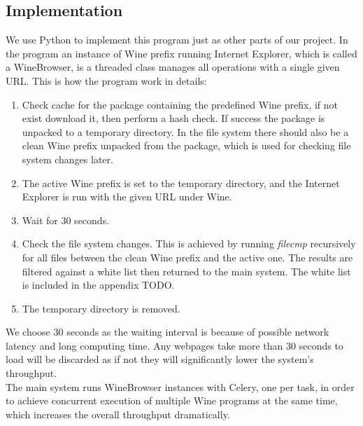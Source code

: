 \subsection{Implementation}
We use Python to implement this program just as other parts of our project. 
In the program an instance of Wine prefix running Internet Explorer, which is called 
a WineBrowser, is a threaded class manages all operations with a single 
given URL. This is how the program work in details:
\begin{enumerate}
\item
Check cache for the package containing the predefined Wine prefix, if not 
exist download it, then perform a hash check.
If success the package is unpacked to a temporary directory. 
In the file system there should also be a clean Wine prefix unpacked from the 
package, which is used for checking file system changes later. 
\item
The active Wine prefix is set to the temporary directory, and the Internet 
Explorer is run with the given URL under Wine. 
\item
Wait for 30 seconds.
\item
Check the file system changes. This is achieved by running {\em filecmp} recursively 
for all files between the clean Wine prefix and the active one. The results 
are filtered against a white list then returned to the main system. The white 
list is included in the appendix TODO. 
\item
The temporary directory is removed. 
\end{enumerate}
We choose 30 seconds as the waiting interval is because of possible network 
latency and long computing time. Any webpages take more than 30 seconds to 
load will be discarded as if not they will significantly lower the system's 
throughput. \\
The main system runs WineBrowser instances with Celery, one per task, in order 
to achieve concurrent execution of multiple Wine programs at the same time, 
which increases the overall throughput dramatically. 
